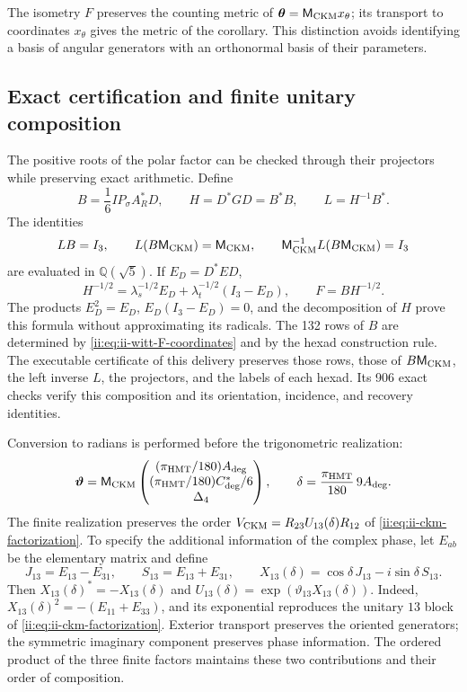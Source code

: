 The isometry \(F\) preserves the counting metric of
\(\boldsymbol\theta=\mathsf M_{\rm CKM}x_\theta\); its transport
to coordinates \(x_\theta\) gives the metric of the corollary. This
distinction avoids identifying a basis of angular generators with an
orthonormal basis of their parameters.

\subsection{Exact certification and finite unitary composition}

The positive roots of the polar factor can be checked through their
projectors while preserving exact arithmetic. Define
\begin{equation}
 B=\frac16IP_\sigma A_R^*D,\qquad
 H=D^*GD=B^*B,\qquad L=H^{-1}B^*.
 \label{ii:eq:ii-witt-radical-free}
\end{equation}
The identities
\[
 LB=I_3,\qquad L(B\mathsf M_{\rm CKM})=\mathsf M_{\rm CKM},\qquad
 \mathsf M_{\rm CKM}^{-1}L(B\mathsf M_{\rm CKM})=I_3
\]
are evaluated in \(\mathbb Q(\sqrt5)\). If \(E_D=D^*ED\),
\[
 H^{-1/2}=\lambda_s^{-1/2}E_D+
          \lambda_t^{-1/2}(I_3-E_D),\qquad F=BH^{-1/2}.
\]
The products \(E_D^2=E_D\), \(E_D(I_3-E_D)=0\), and the
decomposition of \(H\) prove this formula without approximating its
radicals. The 132 rows of \(B\) are determined by
\eqref{ii:eq:ii-witt-F-coordinates} and by the hexad construction
rule. The executable certificate of this delivery preserves those rows,
those of \(B\mathsf M_{\rm CKM}\), the left inverse \(L\),
the projectors, and the labels of each hexad. Its 906 exact
checks verify this composition and its orientation,
incidence, and recovery identities.

Conversion to radians is performed before the trigonometric realization:
\begin{equation}
 \boldsymbol\vartheta=
 \mathsf M_{\rm CKM}
 \begin{pmatrix}(\pi_{\rm HMT}/180)A_{\rm deg}\\
 (\pi_{\rm HMT}/180)C^*_{\rm deg}/6\\\Delta_4\end{pmatrix},
 \qquad
 \delta=\frac{\pi_{\rm HMT}}{180}\,9A_{\rm deg}.
 \label{ii:eq:ii-witt-angular-units}
\end{equation}
The finite realization preserves the order
\(V_{\rm CKM}=R_{23}U_{13}(\delta)R_{12}\) of
\eqref{ii:eq:ii-ckm-factorization}. To specify the additional information
of the complex phase, let \(E_{ab}\) be the elementary matrix and define
\[
 J_{13}=E_{13}-E_{31},\qquad S_{13}=E_{13}+E_{31},\qquad
 X_{13}(\delta)=\cos\delta\,J_{13}-i\sin\delta\,S_{13}.
\]
Then \(X_{13}(\delta)^*=-X_{13}(\delta)\) and
\(U_{13}(\delta)=\exp(\vartheta_{13}X_{13}(\delta))\).
Indeed, \(X_{13}(\delta)^2=-(E_{11}+E_{33})\), and its exponential
reproduces the unitary \(13\) block of
\eqref{ii:eq:ii-ckm-factorization}. Exterior transport preserves the
oriented generators; the symmetric imaginary component preserves
phase information. The ordered product of the three finite
factors maintains these two contributions and their order of composition.

